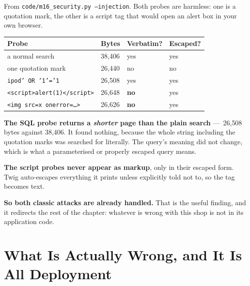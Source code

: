 \begin{measured}
From \texttt{code/m16\_security.py --injection}. Both probes are harmless: one
is a quotation mark, the other is a script tag that would open an alert box in
your own browser.

\begin{longtable}{@{}L{5.2cm}L{2.2cm}L{2.4cm}L{2.2cm}@{}}
\toprule
{}
\textbf{Probe} & \textbf{Bytes} & \textbf{Verbatim?} & \textbf{Escaped?} \\
\midrule
\endhead
a normal search & 38{,}406 & yes & yes \\
one quotation mark & 26{,}440 & no & no \\
\texttt{ipod' OR '1'='1} & 26{,}508 & yes & yes \\
\texttt{<script>alert(1)</script>} & 26{,}648 & \textbf{no} & yes \\
\texttt{<img src=x onerror=\dots>} & 26{,}626 & \textbf{no} & yes \\
\bottomrule
\end{longtable}

\smallskip
\textbf{The SQL probe returns a \emph{shorter} page than the plain search}
---~26{,}508 bytes against 38{,}406. It found nothing, because the whole string
including the quotation marks was searched for literally. The query's meaning
did not change, which is what a parameterised or properly escaped query means.

\smallskip
\textbf{The script probes never appear as markup}, only in their escaped form.
Twig auto-escapes everything it prints unless explicitly told not to, so the
tag becomes text.

\smallskip
\textbf{So both classic attacks are already handled.} That is the useful
finding, and it redirects the rest of the chapter: whatever is wrong with this
shop is not in its application code.
\end{measured}

\section{What Is Actually Wrong, and It Is All Deployment}

